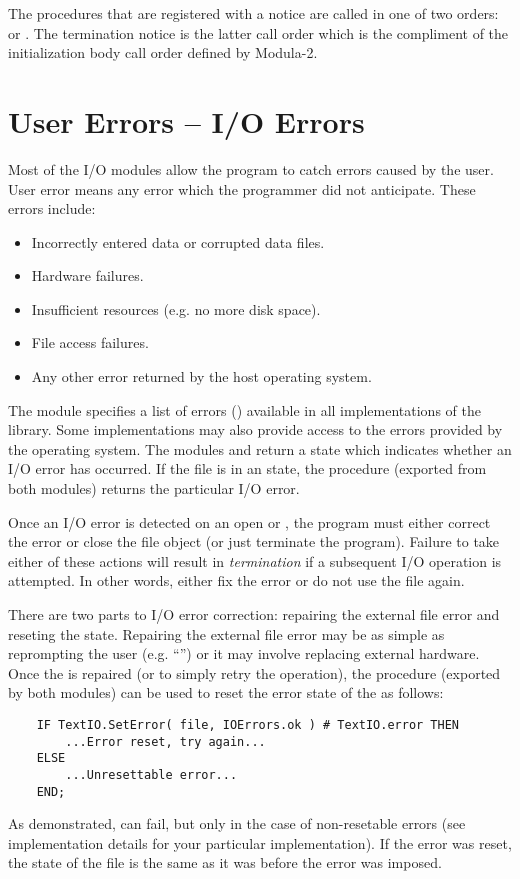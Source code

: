 The procedures that are registered with a notice are called in
one of two orders: 
or .
The termination notice is the latter call order which is the compliment
of the initialization body call order defined by Modula-2.

\section{User Errors -- I/O Errors}

Most of the I/O modules allow the program to catch errors caused
by the user.  User error means any error  which the programmer 
did not anticipate.  These errors include:
\begin{itemize}
\item
    Incorrectly entered data or corrupted data files.
\item
    Hardware failures.
\item
    Insufficient resources (e.g. no more disk space).
\item
    File access failures.
\item
    Any other error returned by the host operating system.
\end{itemize}

The module  specifies a list of errors 
() available in all implementations
of the library. Some implementations may also provide access to 
the errors provided by the operating system.  The modules 
and  return a state which indicates whether an I/O
error has occurred.  If the file is in an  state,
the procedure  (exported from both modules)
returns the particular I/O error.

Once an I/O error is detected on an open 
or , the program must either correct the error
or close the file object  (or just terminate the program).  Failure to take
either of these actions will result in {\em termination} if a  subsequent I/O 
operation is attempted.  In other words, either fix the error or do not
use the file again.


There are
two parts to I/O error correction: repairing the external file error and
reseting the  state.  Repairing the external file error may
be as simple as reprompting the user (e.g. ``'')
or it may involve replacing external hardware.  Once the 
is repaired (or to simply retry the operation), the procedure
 (exported by both modules) can be used to reset
the error state of the  as follows:
\begin{verbatim}
    IF TextIO.SetError( file, IOErrors.ok ) # TextIO.error THEN
        ...Error reset, try again...
    ELSE
        ...Unresettable error...
    END;
\end{verbatim}
As demonstrated,  can fail, but only in the
case of non-resetable errors (see implementation details for
your particular implementation).  If the error was reset,
the state of the file is the same as it was before the error was
imposed.


